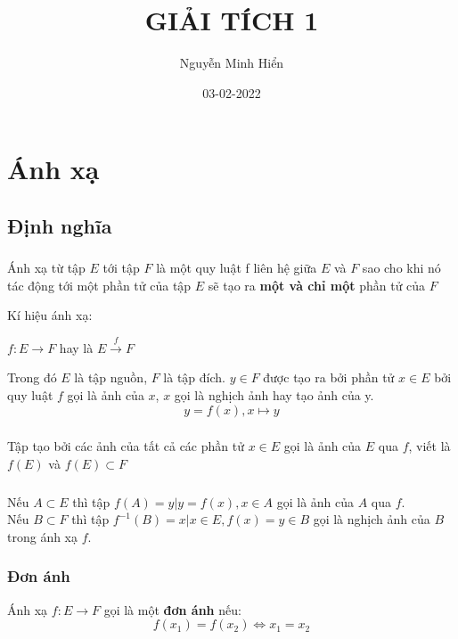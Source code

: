 \documentclass[12pt]{report}
\title{GIẢI TÍCH 1}
\author{Nguyễn Minh Hiển}
\date{03-02-2022}
\begin{document}
\maketitle

\tableofcontents

\chapter{\centering Ánh xạ}
    \section{Định nghĩa}
        \subsection{}
            Ánh xạ từ tập $E$ tới tập $F$ là một quy luật f liên hệ giữa $E$ và $F$
            sao cho khi nó tác động tới một phần tử của tập $E$ sẽ tạo ra \textbf{một và chỉ một} phần tử của $F$
            
            Kí hiệu ánh xạ:
            \begin{center}
                $f : E \rightarrow F$ hay là $E \xrightarrow{f} F$\\
            \end{center}
            Trong đó $E$ là tập nguồn, $F$ là tập đích.
            $y \in F$ được tạo ra bởi phần tử $x \in E$ bởi quy luật $f$ gọi là ảnh của $x$, $x$ gọi là nghịch ảnh hay tạo ảnh của y.
            $$y = f(x), x \mapsto y$$

        \subsection{}
            Tập tạo bởi các ảnh của tất cả các phần tử $x \in E$ gọi là ảnh của $E$ qua $f$, viết là $f(E)$
            và $f(E) \subset F$
        
        \subsection{} 
            Nếu $A \subset E$ thì tập $f(A) = {y | y = f(x), x \in A}$ gọi là ảnh của $A$ qua $f$.\\
            Nếu $B \subset F$ thì tập $f^{-1}(B) = {x | x \in E, f(x) = y \in B}$ gọi là nghịch ảnh của $B$ trong ánh xạ $f$.

        \subsection{Đơn ánh}
            Ánh xạ $f : E \rightarrow F$ gọi là một \textbf{đơn ánh} nếu:
            $$f(x_1) = f(x_2) \Leftrightarrow x_1 = x_2$$
        
\end{document}
